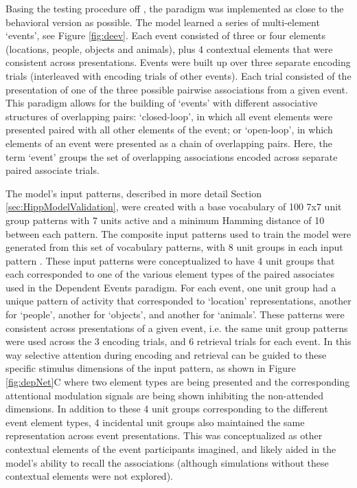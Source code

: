 \documentclass[11pt, titlepage, twoside]{article}
\providecommand{\DIFadd}[1]{{\protect\color{blue}\uwave{#1}}} %
\providecommand{\DIFaddbegin}{} %
\providecommand{\DIFaddend}{} %
\begin{document}
Basing the testing procedure off \textcite{HornerBisbyBushEtAl15}, the paradigm was implemented as close to the behavioral version as possible.  The model learned a series of multi-element `events', see Figure \ref{fig:deev}. Each event consisted of three or four elements (locations, people, objects and animals), plus 4 contextual elements that were consistent across presentations. Events were built up over three separate encoding trials (interleaved with encoding trials of other events). Each trial consisted of the presentation of one of the three possible pairwise associations from a given event. This paradigm allows for the building of `events' with different associative structures of overlapping pairs: `closed-loop', in which all event elements were presented paired with all other elements of the event; or `open-loop', in which elements of an event were presented as a chain of overlapping pairs. Here, the term `event' groups  the set of overlapping associations encoded across separate paired associate trials. 


The model's input patterns, described in more detail Section \ref{sec:HippModelValidation}, were created with a base vocabulary of 100 7x7 unit group patterns with 7 units active and a minimum Hamming distance of 10 between each pattern.  The composite input patterns used to train the model were generated from this set of vocabulary patterns, with 8 unit groups in each input pattern \DIFaddbegin \DIFadd{corresponding to 8 hypothetical posterior cortical regions}\DIFaddend .  These input patterns were conceptualized to have 4 unit groups that each corresponded to one of the various element types of the paired associates used in the Dependent Events paradigm.  For each event, one unit group had a unique pattern of activity that corresponded to `location' representations, another for `people', another for `objects', and another for `animals'.  These patterns were consistent across presentations of a given event, i.e. the same unit group patterns were used across the 3 encoding trials, and 6 retrieval trials for each event. In this way selective attention during encoding and retrieval can be  guided to these specific stimulus dimensions of the input pattern, as shown in Figure \ref{fig:depNet}C where two element types are being presented and the corresponding attentional modulation signals are being shown inhibiting the non-attended dimensions.  In addition to these 4 unit groups corresponding to the different event element types, 4 incidental unit groups also maintained the same representation across event presentations.  This was conceptualized as other contextual elements of the event participants imagined, and likely aided in the model's ability to recall the associations (although simulations without these contextual elements were not explored). 
\end{document}

